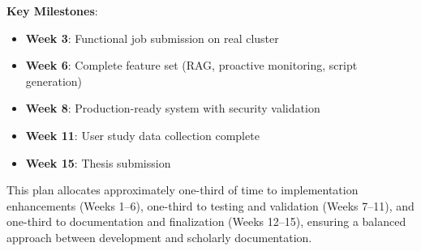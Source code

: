 \textbf{Key Milestones}:
\begin{itemize}
    \item \textbf{Week 3}: Functional job submission on real cluster
    \item \textbf{Week 6}: Complete feature set (RAG, proactive monitoring, script generation)
    \item \textbf{Week 8}: Production-ready system with security validation
    \item \textbf{Week 11}: User study data collection complete
    \item \textbf{Week 15}: Thesis submission
\end{itemize}

This plan allocates approximately one-third of time to implementation enhancements (Weeks 1--6), one-third to testing and validation (Weeks 7--11), and one-third to documentation and finalization (Weeks 12--15), ensuring a balanced approach between development and scholarly documentation.
